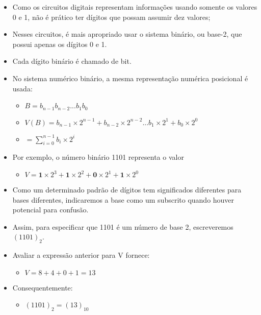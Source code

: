 \begin{frame}{\insertsection}
	\begin{itemize}
        \item Como os circuitos digitais representam informações usando somente os valores 0 e 1, não é prático ter dígitos que possam assumir dez valores;
        \item Nesses circuitos, é mais apropriado usar o sistema binário, ou base-2, que possui apenas os dígitos 0 e 1. 
        \item Cada dígito binário é chamado de bit. 
        \item No sistema numérico binário, a mesma representação numérica posicional é usada:
        \begin{itemize}
            \item $B = b_{n-1}b_{n-2} ... b_1 b_0$
            \item $V(B) = b_{n-1} \times 2^{n-1} + b_{n-2} \times 2^{n-2} ... b_1 \times 2^1 + b_0 \times 2^0$
            \item $= \sum\limits_{i=0}^{n-1} b_i \times 2^i$
        \end{itemize}
    \end{itemize}
\end{frame}


\begin{frame}{\insertsection}
	\begin{itemize}
        \item Por exemplo, o número binário 1101 representa o valor
        \begin{itemize}
            \item $V = \textbf{1} \times 2^3 + \textbf{1} \times 2^2 + \textbf{0} \times 2^1 + \textbf{1} \times 2^0$
        \end{itemize}
        \item Como um determinado padrão de dígitos tem significados diferentes para bases diferentes, indicaremos a base como um subscrito quando houver potencial para confusão. 
        \item Assim, para especificar que 1101 é um número de base 2, escreveremos $(1101)_2$. 
        \item Avaliar a expressão anterior para V fornece:
        \begin{itemize}
            \item $V = 8 + 4 + 0 + 1 = 13$
        \end{itemize}
        \item Consequentemente:
        \begin{itemize}
            \item $(1101)_2 = (13)_{10}$
        \end{itemize}
    \end{itemize}
\end{frame}



